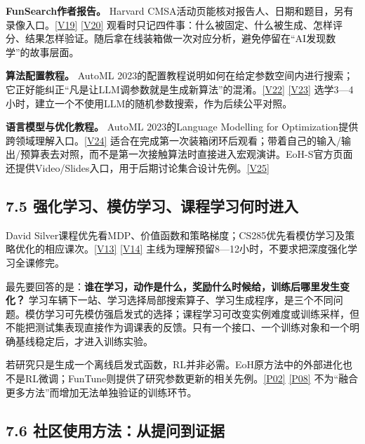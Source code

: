 \textbf{FunSearch作者报告。} Harvard
CMSA活动页能核对报告人、日期和题目，另有录像入口。\href{https://cmsa.fas.harvard.edu/event/mmlworkshop_1024/}{{[}V19{]}}
\href{https://www.youtube.com/watch?v=VJ_meFdGwE8}{{[}V20{]}}
观看时只记四件事：什么被固定、什么被生成、怎样评分、结果怎样验证。随后拿在线装箱做一次对应分析，避免停留在``AI发现数学''的故事层面。

\textbf{算法配置教程。} AutoML
2023的配置教程说明如何在给定参数空间内进行搜索；它正好能纠正``凡是让LLM调参数就是生成新算法''的混淆。\href{https://2023.automl.cc/program/tutorials/survey-of-methods/}{{[}V22{]}}
\href{https://www.tele-task.de/lecture/video/10161/}{{[}V23{]}}
选学3---4小时，建立一个不使用LLM的随机参数搜索，作为后续公平对照。

\textbf{语言模型与优化教程。} AutoML 2023的Language Modelling for
Optimization提供跨领域理解入口。\href{https://2023.automl.cc/program/tutorials/language-modelling-for-optimization/}{{[}V24{]}}
适合在完成第一次装箱闭环后观看；带着自己的输入/输出/预算表去对照，而不是第一次接触算法时直接进入宏观演讲。EoH-S官方页面还提供Video/Slides入口，用于后期讨论集合设计先例。\href{https://ojs.aaai.org/index.php/AAAI/article/view/41038}{{[}V25{]}}

\subsection{7.5
强化学习、模仿学习、课程学习何时进入}\label{ux5f3aux5316ux5b66ux4e60ux6a21ux4effux5b66ux4e60ux8bfeux7a0bux5b66ux4e60ux4f55ux65f6ux8fdbux5165}

David
Silver课程优先看MDP、价值函数和策略梯度；CS285优先看模仿学习及策略优化的相应课次。\href{https://www.davidsilver.uk/teaching/}{{[}V13{]}}
\href{https://rail.eecs.berkeley.edu/deeprlcourse/}{{[}V14{]}}
主线为理解预留8---12小时，不要求把深度强化学习全课修完。

最先要回答的是：\textbf{谁在学习，动作是什么，奖励什么时候给，训练后哪里发生变化？}
学习车辆下一站、学习选择局部搜索算子、学习生成程序，是三个不同问题。模仿学习可先模仿强启发式的选择；课程学习可改变实例难度或训练采样，但不能把测试集表现直接作为调课表的反馈。只有一个接口、一个训练对象和一个明确基线稳定后，才进入训练实验。

若研究只是生成一个离线启发式函数，RL并非必需。EoH原方法中的外部进化也不是RL微调；FunTune则提供了研究参数更新的相关先例。\href{https://arxiv.org/abs/2401.02051}{{[}P02{]}}
\href{https://arxiv.org/abs/2504.05108}{{[}P08{]}}
不为``融合更多方法''而增加无法单独验证的训练环节。

\subsection{7.6
社区使用方法：从提问到证据}\label{ux793eux533aux4f7fux7528ux65b9ux6cd5ux4eceux63d0ux95eeux5230ux8bc1ux636e}

